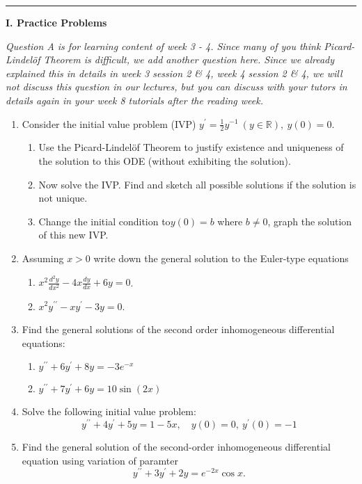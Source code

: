 \documentclass[11pt,a4paper,twoside]{article}
\begin{document}
	\rule{\textwidth}{0.4pt}
	\textbf{I. Practice Problems}\par
	\textit{Question A is for learning content of week 3 - 4. Since many of you think Picard-Lindel\"{o}f Theorem is difficult, we add another question here. Since we already explained this in details in week 3 session 2 \& 4, week 4 session 2 \& 4, we will not discuss this question in our lectures, but you can discuss with your tutors in details again in your week 8 tutorials after the reading week.}
	\begin{enumerate}[\bfseries A.]
		\item Consider the initial value problem (IVP) $y^\prime = \frac{1}{2}y^{-1}\ (y\in \mathbb{R}),\ y(0) = 0$.
	\begin{enumerate}[\bfseries 1)]
		\item Use the Picard-Lindel\"{o}f Theorem to justify existence and uniqueness of the solution to this ODE (without exhibiting the solution).
		\item Now solve the IVP. Find and sketch all possible solutions if the solution is not unique.
		\item Change the initial condition to$ y(0) = b$ where $b \neq 0$, graph the solution of this new IVP.
	\end{enumerate}
	\item Assuming $x > 0$ write down the general solution to the Euler-type equations
	\begin{enumerate}[\bfseries 1)]
		\item $x^2\frac{d^2y}{dx^2} - 4x\frac{dy}{dx} + 6y = 0$.
		\item $x^2y^{\prime\prime} - xy^\prime - 3y = 0$.
	\end{enumerate}
	\item Find the general solutions of the second order inhomogeneous differential equations:
	\begin{enumerate}
		\item $y^{\prime\prime} + 6y^\prime + 8y = -3e^{-x}$
		\item $y^{\prime\prime} + 7y^\prime + 6y = 10\sin(2x)$
	\end{enumerate}
	\item Solve the following initial value problem:
	$$
	y^{\prime\prime} + 4y^\prime + 5y = 1 - 5x,\quad y(0) = 0,\ y^\prime(0) = -1
	$$
	\item Find the general solution of the second-order inhomogeneous differential equation using variation of paramter
	$$
	y^{\prime\prime} + 3y^\prime + 2y = e^{-2x}\cos x.
	$$
	\end{enumerate}
\end{document}
